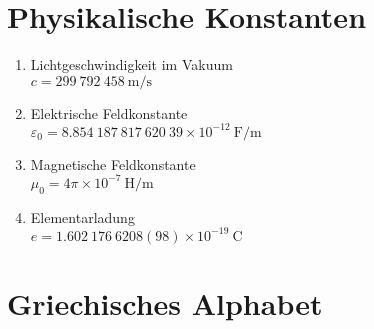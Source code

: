 \documentclass[a4paper,10pt,fleqn,twocolumn,twoside,openany]{book}
\numberwithin{equation}{chapter}
\newcommand{\unit}[1]{\mathrm{#1}}
\begin{document}
\section{Physikalische Konstanten}

\begin{enumerate}
\item Lichtgeschwindigkeit im Vakuum\\
$c=299\:792\:458\:\unit{m/s}$

\item Elektrische Feldkonstante\\
$\varepsilon_0 = 8.854\:187\:817\:620\:39\times 10^{-12}\:\unit{F/m}$

\item Magnetische Feldkonstante\\
$\mu_0 = 4\pi\times 10^{-7}\:\unit{H/m}$

\item Elementarladung\\
$e = 1.602\:176\:6208(98)\times 10^{-19}\:\unit{C}$
\end{enumerate}

\newpage
\section{Griechisches Alphabet}
\end{document}

